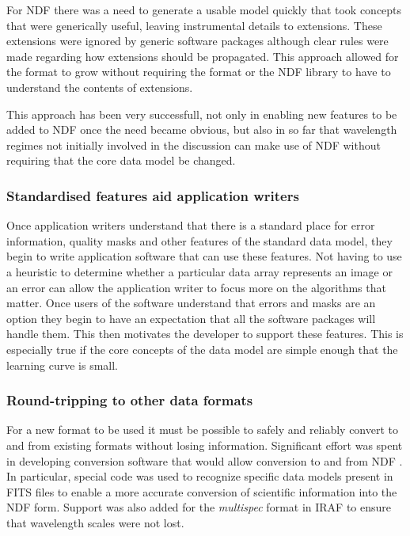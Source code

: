 \documentclass[final,authoryear,5p,times,twocolumn]{elsarticle}
\begin{document}
{For NDF there was a need to generate a usable model quickly that took
concepts that were generically useful, leaving instrumental details to
extensions. These extensions were ignored by generic software packages
although clear rules were made regarding how extensions should be
propagated. This approach allowed for the format to grow without
requiring the format or the NDF library to have to understand the
contents of extensions.

This approach has been very successfull, not only in enabling new
features to be added to NDF once the need became obvious, but also
in so far that wavelength regimes not initially involved in the
discussion can make use of NDF without requiring that the core data
model be changed.

\subsubsection{Standardised features aid application writers}

Once application writers understand that there is a standard place for
error information, quality masks and other features of the standard
data model, they begin to write application software that can use
these features. Not having to use a heuristic to determine whether a
particular data array represents an image or an error can allow the
application writer to focus more on the algorithms that matter. Once
users of the software understand that errors and masks are an option
they begin to have an expectation that all the software packages will
handle them. This then motivates the developer to support these
features.  This is especially true if the core concepts of the data
model are simple enough that the learning curve is small.

\subsubsection{Round-tripping to other data formats}

For a new format to be used it must be possible to safely and reliably
convert to and from existing formats without losing information.
Significant effort was spent in developing conversion software that
would allow conversion to and from NDF
\citep{SUN55,1997STARB..19...14C}. In particular, special code was
used to recognize specific data models present in FITS files to enable
a more accurate conversion of scientific information into the NDF
form. Support was also added for the \emph{multispec} format in IRAF
\citep{1993ASPC...52..467V} to ensure that wavelength scales were not
lost.

}
\end{document}
